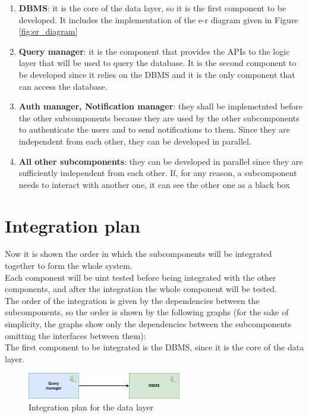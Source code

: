 \begin{enumerate}
    \item \textbf{DBMS}: it is the core of the data layer, so it is the first component to be developed. It includes the implementation of the e-r diagram given in Figure \ref{fig:er_diagram}
    \item \textbf{Query manager}: it is the component that provides the APIs to the logic layer that will be used to query the database. It is the second component to be developed since it relies on the DBMS and it is the only component that can access the database.
    \item \textbf{Auth manager, Notification manager}: they shall be implemetnted before the other subcomponents because they are used by the other subcomponents to authenticate the users and to send notifications to them. Since they are independent from each other, they can be developed in parallel.
    \item \textbf{All other subcomponents}: they can be developed in parallel since they are sufficiently independent from each other. If, for any reason, a subcomponent needs to interact with another one, it can see the other one as a black box
\end{enumerate}

\section{Integration plan}
Now it is shown the order in which the subcomponents will be integrated together to form the whole system.\\
Each component will be uint tested before being integrated with the other components, and after the integration the whole component will be tested.\\
The order of the integration is given by the dependencies between the subcomponents, so the order is shown by the following graphs (for the sake of simplicity, the graphs show only the dependencies between the subcomponents omitting the interfaces between them):\\

The first component to be integrated is the DBMS, since it is the core of the data layer.\\

\begin{figure}[H]
    \centering
    \includegraphics[width=0.6\textwidth]{images/test_plan/test-plan-1.png}
    \caption{Integration plan for the data layer}
    \label{fig:test-plan-1}
\end{figure}

